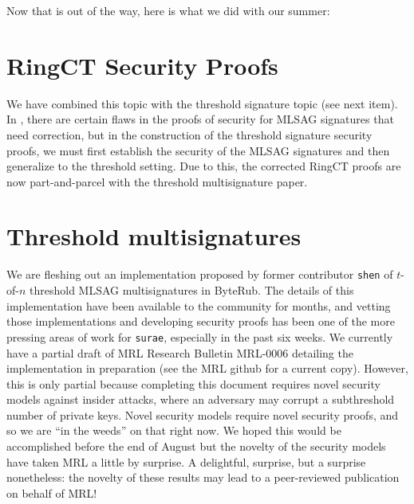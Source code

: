 \documentclass[12pt,english]{mrl}
\theoremstyle{definition}
\numberwithin{equation}{section}
\numberwithin{figure}{section}
\numberwithin{equation}{section}
\numberwithin{equation}{section}
\numberwithin{figure}{section}
\begin{document}
Now that is out of the way, here is what we did with our summer:


\section{RingCT Security Proofs} 

We have combined this topic with the threshold signature topic (see next item). In \cite{noether2016ring}, there are certain flaws in the proofs of security for MLSAG signatures that need correction, but in the construction of the threshold signature security proofs, we must first establish the security of the MLSAG signatures and then generalize to the threshold setting. Due to this, the corrected RingCT proofs are now part-and-parcel with the threshold multisignature paper.
    
    
\section{Threshold multisignatures} 

We are fleshing out an implementation proposed by former contributor \texttt{shen} of $t$-of-$n$ threshold MLSAG multisignatures in ByteRub. The details of this implementation have been available to the community for months, and vetting those implementations and developing security proofs has been one of the more pressing areas of work for \texttt{surae}, especially in the past six weeks. We currently have a partial draft of MRL Research Bulletin MRL-0006 detailing the implementation in preparation (see the MRL github for a current copy). However, this is only partial because completing this document requires novel security models against insider attacks, where an adversary may corrupt a subthreshold number of private keys. Novel security models require novel security proofs, and so we are ``in the weeds'' on that right now. We hoped this would be accomplished before the end of August but the novelty of the security models have taken MRL a little by surprise. A delightful, surprise, but a surprise nonetheless: the novelty of these results may lead to a peer-reviewed publication on behalf of MRL!
    
\end{document}
